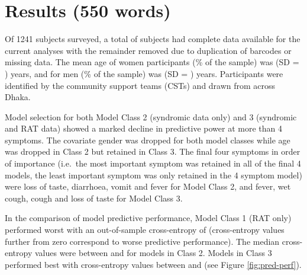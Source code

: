 \documentclass[]{elsarticle} %
\begin{document}
\hypertarget{results-550-words}{%
\section{Results (550 words)}\label{results-550-words}}

Of 1241 subjects surveyed, a total of  subjects had complete data available for the current analyses with the remainder removed due to duplication of barcodes or missing data.
The mean age of women participants (\% of the sample) was  (SD = ) years, and for men (\% of the sample) was  (SD = ) years.
Participants were identified by the community support teams (CSTs) and drawn from across Dhaka.

Model selection for both Model Class 2 (syndromic data only) and 3 (syndromic and RAT data) showed a marked decline in predictive power at more than 4 symptoms.
The covariate gender was dropped for both model classes while age was dropped in Class 2 but retained in Class 3.
The final four symptoms in order of importance (i.e.~the most important symptom was retained in all of the final 4 models, the least important symptom was only retained in the 4 symptom model) were loss of taste, diarrhoea, vomit and fever for Model Class 2, and fever, wet cough, cough and loss of taste for Model Class 3.

In the comparison of model predictive performance, Model Class 1 (RAT only) performed worst with an out-of-sample cross-entropy of  (cross-entropy values further from zero correspond to worse predictive performance).
The median cross-entropy values were between  and  for models in Class 2.
Models in Class 3 performed best with cross-entropy values between  and  (see Figure \ref{fig:pred-perf}).
\end{document}
